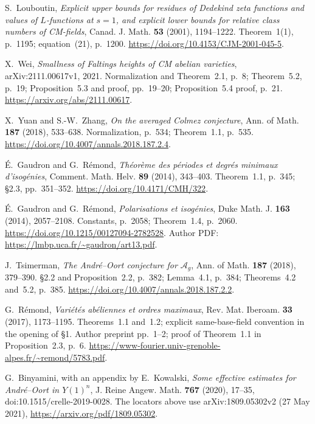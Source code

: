 S.~Louboutin, \emph{Explicit upper bounds for residues of Dedekind zeta
functions and values of $L$-functions at $s=1$, and explicit lower bounds
for relative class numbers of CM-fields}, Canad. J. Math. \textbf{53}
(2001), 1194--1222. Theorem~1(1), p.~1195; equation~(21), p.~1200.
\url{https://doi.org/10.4153/CJM-2001-045-5}.

X.~Wei, \emph{Smallness of Faltings heights of CM abelian varieties},
arXiv:2111.00617v1, 2021. Normalization and Theorem~2.1, p.~8;
Theorem~5.2, p.~19; Proposition~5.3 and proof, pp.~19--20;
Proposition~5.4 proof, p.~21.
\url{https://arxiv.org/abs/2111.00617}.

X.~Yuan and S.-W.~Zhang, \emph{On the averaged Colmez conjecture},
Ann. of Math. \textbf{187} (2018), 533--638.
Normalization, p.~534; Theorem~1.1, p.~535.
\url{https://doi.org/10.4007/annals.2018.187.2.4}.

\'E.~Gaudron and G.~R\'emond, \emph{Th\'eor\`eme des p\'eriodes et
degr\'es minimaux d'isog\'enies}, Comment. Math. Helv. \textbf{89}
(2014), 343--403. Theorem~1.1, p.~345; \S2.3, pp.~351--352.
\url{https://doi.org/10.4171/CMH/322}.

\'E.~Gaudron and G.~R\'emond, \emph{Polarisations et isog\'enies},
Duke Math. J. \textbf{163} (2014), 2057--2108.
Constants, p.~2058; Theorem~1.4, p.~2060.
\url{https://doi.org/10.1215/00127094-2782528}.
Author PDF: \url{https://lmbp.uca.fr/~gaudron/art13.pdf}.

J.~Tsimerman, \emph{The Andr\'e--Oort conjecture for $\mathcal A_g$},
Ann. of Math. \textbf{187} (2018), 379--390.
\S2.2 and Proposition~2.2, p.~382; Lemma~4.1, p.~384;
Theorems~4.2 and~5.2, p.~385.
\url{https://doi.org/10.4007/annals.2018.187.2.2}.

G.~R\'emond, \emph{Vari\'et\'es ab\'eliennes et ordres maximaux},
Rev. Mat. Iberoam. \textbf{33} (2017), 1173--1195.
Theorems~1.1 and~1.2; explicit same-base-field convention in the
opening of \S1.  Author preprint pp.~1--2; proof of Theorem~1.1
in Proposition~2.3, p.~6.
\url{https://www-fourier.univ-grenoble-alpes.fr/~remond/5783.pdf}.

G.~Binyamini, with an appendix by E.~Kowalski,
\emph{Some effective estimates for Andr\'e--Oort in $Y(1)^n$},
J. Reine Angew. Math. \textbf{767} (2020), 17--35,
doi:10.1515/crelle-2019-0028.
The locators above use arXiv:1809.05302v2 (27 May 2021),
\url{https://arxiv.org/pdf/1809.05302}.
